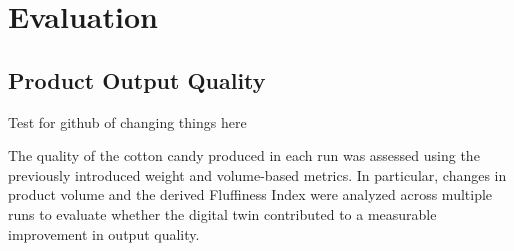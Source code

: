 \chapter{Evaluation}
\label{sec:evaluation}

\section{Product Output Quality}

Test for github of changing things here


The quality of the cotton candy produced in each run was assessed using the previously introduced weight and volume-based metrics. In particular, changes in product volume and the derived Fluffiness Index were analyzed across multiple runs to evaluate whether the digital twin contributed to a measurable improvement in output quality.